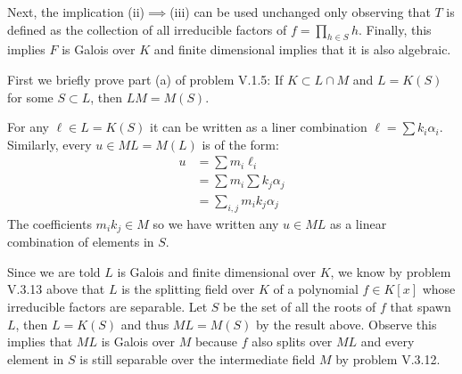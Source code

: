 Next, the implication (ii)$\implies$(iii) can be used unchanged only observing that $T$ is defined as the collection of all irreducible factors of $f=\prod_{h\in S}h$. 
Finally, this implies $F$ is Galois over $K$ and finite dimensional implies that it is also algebraic.

First we briefly prove part (a) of problem V.1.5: If $K\subset L\cap M$ and $L=K(S)$ for some $S\subset L$, then $LM = M(S)$.

For any $\ell \in L=K(S)$ it can be written as a liner combination $\ell=\sum k_i\alpha_i$. Similarly, every $u\in ML=M(L)$ is of the form:
\begin{align*}
u &= \sum m_i \ell_i\\
  &= \sum m_i \sum k_j \alpha_j\\
  &= \sum_{i,j} m_i k_j \alpha_j
\end{align*}
The coefficients $m_ik_j\in M$ so we have written any $u\in ML$ as a linear combination of elements in $S$.

Since we are told $L$ is Galois and finite dimensional over $K$, we know by problem V.3.13 above that $L$ is the splitting field over $K$ of a polynomial $f\in K[x]$ whose irreducible factors are separable.
Let $S$ be the set of all the roots of $f$ that spawn $L$, then $L= K(S)$ and thus $ML=M(S)$ by the result above.
Observe this implies that $ML$ is Galois over $M$ because $f$ also splits over $ML$ and every element in $S$ is still separable over the intermediate field $M$ by problem V.3.12.


